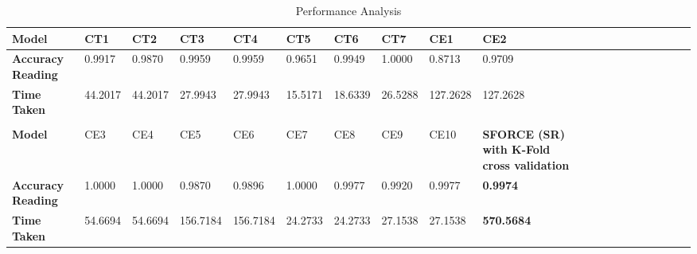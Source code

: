 \documentclass[10pt,journal,compsoc]{IEEEtran}
\begin{document}
\begin{table}[!t]
\scriptsize
\caption{Performance Analysis}
\label{table:t1}
\centering
{
\begin{tabular}{| l | l | l | l | l | l | l | l | l | l | l | l | l | l | l | l | l | l | l | l |}
\hline
\textbf{Model} & {CT1} & {CT2} & {CT3} & {CT4} & {CT5} & {CT6} & {CT7} & {CE1} & {CE2}\\
\hline
\textbf{Accuracy Reading}& 0.9917 & 0.9870 & 0.9959 & 0.9959 & 0.9651 & 0.9949 & 1.0000 & 0.8713 & 0.9709\\
\hline
\textbf{Time Taken}& 44.2017 & 44.2017 & 27.9943 & 27.9943 & 15.5171 & 18.6339 & 26.5288 & 127.2628 & 127.2628\\
\hline
&&&&&&&&&\\
\hline
\textbf{Model} & {CE3} & {CE4} & {CE5} & {CE6} & {CE7} & {CE8} & {CE9} & {CE10} & \textbf{SFORCE (SR) with K-Fold cross validation} \\
\hline
\textbf{Accuracy Reading}& 1.0000 & 1.0000 & 0.9870 & 0.9896 & 1.0000 & 0.9977 & 0.9920 & 0.9977 & \textbf{0.9974} \\
\hline
\textbf{Time Taken}& 54.6694 & 54.6694 & 156.7184 & 156.7184 & 24.2733 & 24.2733 & 27.1538 & 27.1538 & \textbf{570.5684} \\
\hline
\end{tabular}
}
\end{table}
% 
\end{document}
